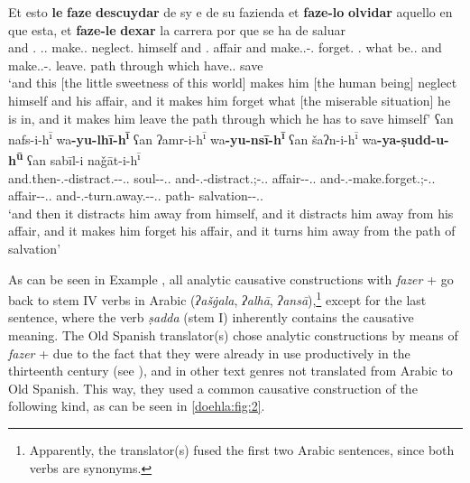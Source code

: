 \documentclass[output=paper]{langscibook}
\begin{document}
\begin{exe}
    \ex\label{doehla:ex:14}
    \begin{xlist}
        \ex\label{doehla:ex:14a}
        \gll Et esto \textbf{le} \textbf{faze} \textbf{descuydar} de sy e de su fazienda et \textbf{faze-lo} \textbf{olvidar} aquello en que esta, et \textbf{faze-le} \textbf{dexar} la carrera por que se ha de saluar \\
        and \DEM.\PROX{} \OBJ.\Third\SG.\M{} make.\Third\SG.\PRS{} neglect.\Inf{} \GEN{} himself and \GEN{} \POSS.\Third\SG{} affair and make.\Third\SG.\PRS-\OBJ.\Third\SG{} forget.\Inf{} \DEM.\DIST{} \LOC{} what be.\Third\SG.\PRS{} and make.\Third\SG.\PRS-\OBJ.\Third\SG{} leave.\Inf{} \Def{} path through which \REFL{} have.\Third\SG.\PRS{} \PREP{} save \\
        \glt ‘and this [the little sweetness of this world] makes him [the 	human being] neglect himself and his affair, and it makes him 	forget what [the miserable situation] he is in, and it makes 	him leave the path through which he has to save himself’ \citep[BC.69e]{dohla_libro_2009}
        \ex\label{doehla:ex:14b}
         ʕan {nafs-i-h\textsuperscript{ī}} {wa\textbf{-yu-lhī-h\textsuperscript{ī}}} ʕan {ʔamr-i-h\textsuperscript{ī}} {wa\textbf{-yu-nsī-h\textsuperscript{ī}}} ʕan {šaʔn-i-h\textsuperscript{ī}} {wa\textbf{-ya-ṣudd-u-h\textsuperscript{ū}}} ʕan sabīl-i {naǧāt-i-h\textsuperscript{ī}} \\
        and.then-\Third\SG{}.\M-distract.\IPFV-\IND-\OBJ.\Third\SG.\M{} \ABL{} soul-\GEN-\POSS.\Third\SG.\M{} and-\Third\SG.\M-distract.\IPFV;\IND-\OBJ.\Third\SG.\M{} \ABL{} affair-\GEN-\POSS.\Third\SG.\M{} and-\Third\SG.\M-make.forget.\IPFV;\IND-\OBJ.\Third\SG.\M{} \ABL{} affair-\GEN-\POSS.\Third\SG.\M{} and-\Third\SG.\M-turn.away.\IPFV-\Inf-\OBJ.\Third\SG.\M{} \ABL{} path-\GEN{} salvation-\GEN-\POSS.\Third\SG.\M{} \\
        \glt ‘and then it distracts him away from himself, and it distracts him away from his affair, and it makes him forget his affair, and it turns him away from the path of salvation’ \citep[fo. 21r]{ibn_al-muqaffa_kitab_nodate}
    \end{xlist}
\end{exe}


As can be seen in Example , all analytic causative constructions with \textit{fazer} + \Inf{} go back to stem IV verbs in Arabic (\textit{ʔašġala}, \textit{ʔalhā}, \textit{ʔansā}),\footnote{Apparently, the translator(s) fused the first two Arabic sentences, since both verbs are synonyms.} except for the last sentence, where the verb \textit{ṣadda} (stem I) inherently contains the causative meaning. The Old Spanish translator(s) chose analytic constructions by means of \textit{fazer} + \Inf{} due to the fact that they were already in use productively in the thirteenth century (see \citealt{sanaphre_villanueva_analytic_2010}), and in other text genres not translated from Arabic to Old Spanish. This way, they used a common causative construction of the following kind, as can be seen in \autoref{doehla:fig:2}.
\end{document}
